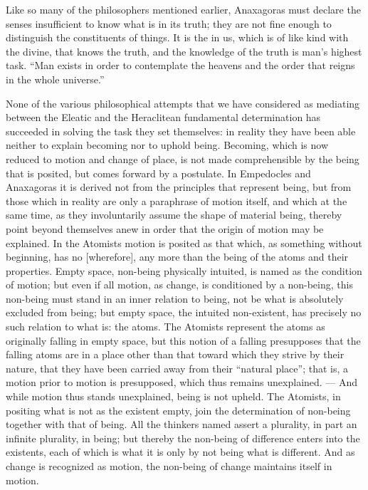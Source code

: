 Like so many of the philosophers mentioned earlier, Anaxagoras must
declare the senses insufficient to know what is in its truth; they are
not fine enough to distinguish the constituents of things. It is the
 in us, which is of like kind with the divine, that knows the
truth, and the knowledge of the truth is man's highest task. ``Man
exists in order to contemplate the heavens and the order that reigns
in the whole universe.''

\divrule

None of the various philosophical attempts that we have
considered as mediating between the Eleatic and the Heraclitean
fundamental determination has succeeded in solving the task they set
themselves: in reality they have been able neither to explain becoming
nor to uphold being. Becoming, which is now reduced to motion and
change of place, is not made comprehensible by the being that is
posited, but comes forward by a postulate. In Empedocles and Anaxagoras
it is derived not from the principles that represent being, but from
those which in reality are only a paraphrase of motion itself, and
which at the same time, as they involuntarily assume the shape of
material being, thereby point beyond themselves anew in order that the
origin of motion may be explained. In the Atomists motion is posited as
that which, as something without beginning, has no 
[wherefore], any more than the being of the atoms and their properties.
Empty space, non-being physically intuited, is named as the condition
of motion; but even if all motion, as change, is conditioned by a
non-being, this non-being must stand in an inner relation to being, not
be what is absolutely excluded from being; but empty space, the
intuited non-existent, has precisely no such relation to what is: the
atoms. The Atomists represent the atoms as originally falling in empty
space, but this notion of a falling presupposes that the falling atoms
are in a place other than that toward which they strive by their
nature, that they have been carried away from their ``natural place'';
that is, a motion prior to motion is presupposed, which thus remains
unexplained. --- And while motion thus stands unexplained, being is not
upheld. The Atomists, in positing what is not as the existent empty,
join the determination of non-being together with that of being. All
the thinkers named assert a plurality, in part an infinite plurality,
in being; but thereby the non-being of difference enters into the
existents, each of which is what it is only by not being what is
different. And as change is recognized as motion, the
non-being of change maintains itself in motion.

